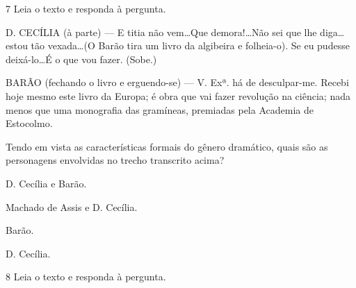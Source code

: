 \pagebreak
\num{7} Leia o texto e responda à pergunta.

\begin{myquote}
\textit{}

D. CECÍLIA (à parte) --- E titia não vem\ldots Que demora!\ldots Não sei
que lhe diga\ldots estou tão vexada\ldots (O Barão tira um livro da algibeira
e folheia-o). Se eu pudesse deixá-lo\ldots É o que vou fazer. (Sobe.)

BARÃO (fechando o livro e erguendo-se) --- V. Exª. há de desculpar-me.
Recebi hoje mesmo este livro da Europa; é obra que vai fazer revolução na
ciência; nada menos que uma monografia das gramíneas, premiadas pela 
Academia de Estocolmo.

\end{myquote}

Tendo em vista as características formais do gênero dramático, quais são
as personagens envolvidas no trecho transcrito acima?

\begin{escolha}

  \item D. Cecília e Barão.

  \item Machado de Assis e D. Cecília.

  \item Barão.

  \item D. Cecília.

\end{escolha} 

\num{8} Leia o texto e responda à pergunta.

